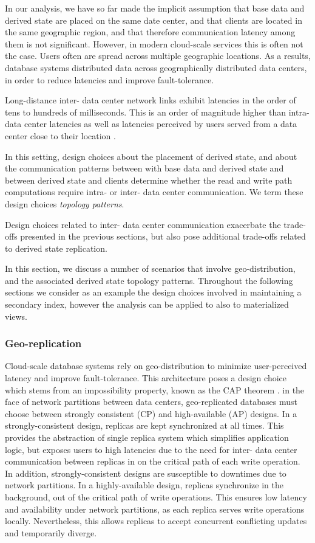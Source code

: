 In our analysis, we have so far made the implicit assumption that base data and derived state are placed on the
same date center, and that clients are located in the same geographic region,
and that therefore communication latency among them is not significant.
However, in modern cloud-scale services this is often not the case.
Users often are spread across multiple geographic locations.
As a results, database systems distributed data across geographically distributed data centers,
in order to reduce latencies and improve fault-tolerance.

Long-distance inter- data center network links exhibit latencies in the order of tens to hundreds of milliseconds.
This is an order of magnitude higher than intra- data center latencies as well as latencies perceived by users served
from a data center close to their location \cite{kleppmann:localfirst}.

In this setting, design choices about the placement of derived state,
and about the communication patterns between with base data and derived state and between derived state and clients
determine whether the read and write path computations require intra- or inter- data center communication.
We term these design choices \textit{topology patterns}.

Design choices related to inter- data center communication exacerbate the trade-offs presented in the previous sections,
but also pose additional trade-offs related to derived state replication.

In this section, we discuss a number of scenarios that involve geo-distribution, and the associated derived state
topology patterns.
Throughout the following sections we consider as an example the design choices involved in maintaining a secondary index,
however the analysis can be applied to also to materialized views.

\subsubsection{Geo-replication}
Cloud-scale database systems rely on geo-distribution to minimize user-perceived latency and improve fault-tolerance.
This architecture poses a design choice which stems from an impossibility property, known as the CAP theorem
\cite{brewer:cap}.
in the face of network partitions between data centers, geo-replicated databases must choose between strongly consistent
(CP) and high-available (AP) designs.
In a strongly-consistent design, replicas are kept synchronized at all times.
This provides the abstraction of single replica system which simplifies application logic, but exposes users to high
latencies due to the need for inter- data center communication between replicas in on the critical path of each write
operation.
In addition, strongly-consistent designs are susceptible to downtimes due to network partitions.
In a highly-available design, replicas synchronize in the background, out of the critical path of write operations.
This ensures low latency and availability under network partitions, as each replica serves write operations locally.
Nevertheless, this allows replicas to accept concurrent conflicting updates and temporarily diverge.

